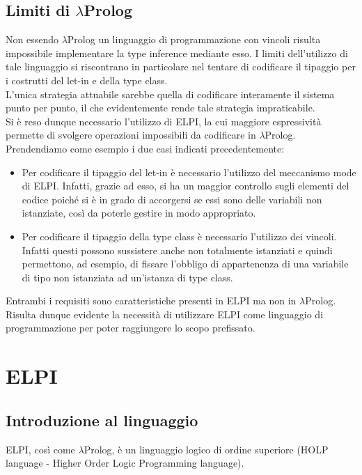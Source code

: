 \documentclass[12pt,a4paper,openright,twoside]{report}
\begin{document}
\subsection{Limiti di $\lambda$Prolog}
Non essendo $\lambda$Prolog un linguaggio di programmazione con vincoli risulta impossibile implementare la type inference mediante esso. I limiti dell'utilizzo di tale linguaggio si riscontrano in particolare nel tentare di codificare il tipaggio per i costrutti del let-in e della type class.\\
L'unica strategia attuabile sarebbe quella di codificare interamente il sistema punto per punto, il che evidentemente rende tale strategia impraticabile.\\
Si è reso dunque necessario l'utilizzo di ELPI, la cui maggiore espressività permette di svolgere operazioni impossibili da codificare in $\lambda$Prolog. Prendendiamo come esempio i due casi indicati precedentemente:
\begin{itemize}
 \item Per codificare il tipaggio del let-in è necessario l'utilizzo del meccanismo mode di ELPI. Infatti, grazie ad esso, si ha un maggior controllo sugli elementi del codice poiché si è in grado di accorgersi se essi sono delle variabili non istanziate, così da poterle gestire in modo appropriato.
 \item Per codificare il tipaggio della type class è necessario l'utilizzo dei vincoli. Infatti questi possono sussistere anche non totalmente istanziati e quindi permettono, ad esempio, di fissare l'obbligo di appartenenza di una variabile di tipo non istanziata ad un'istanza di type class.
\end{itemize}
Entrambi i requisiti sono caratteristiche presenti in ELPI ma non in $\lambda$Prolog. Risulta dunque evidente la necessità di utilizzare ELPI come linguaggio di programmazione per poter raggiungere lo scopo prefissato.

\section{ELPI}
\subsection{Introduzione al linguaggio}
ELPI, così come $\lambda$Prolog, è un linguaggio logico di ordine superiore (HOLP language - Higher Order Logic Programming language).
\end{document}
